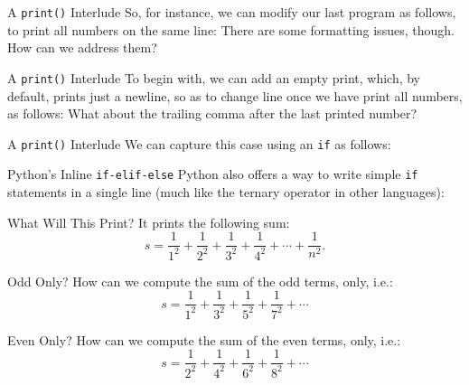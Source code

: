 \documentclass[aspectratio=169, 12pt, xcolor=table]{beamer}
\begin{document}
	\begin{frame}{A \texttt{print()} Interlude}
		So, for instance, we can modify our last program as follows, to print all numbers on the same line:
		\pause
		There are some formatting issues, though. How can we address them?
	\end{frame}

	\begin{frame}{A \texttt{print()} Interlude}
		To begin with, we can add an empty print, which, by default, prints just a newline, so as to change line once we have print all numbers, as follows:
		\pause
		What about the trailing comma after the last printed number?
	\end{frame}

	\begin{frame}{A \texttt{print()} Interlude}
		We can capture this case using an \texttt{if} as follows:
		
	\end{frame}

	\begin{frame}{Python's Inline \texttt{if-elif-else}}
		Python also offers a way to write simple \texttt{if} statements in a single line (much like the ternary operator in other languages):
		
	\end{frame}

	\begin{frame}{What Will This Print?}
		\pause
		It prints the following sum:
		\[s=\frac{1}{1^2}+\frac{1}{2^2}+\frac{1}{3^2}+\frac{1}{4^2}+\cdots+\frac{1}{n^2}.\]
	\end{frame}

	\begin{frame}{Odd Only?}
		How can we compute the sum of the odd terms, only, i.e.:
		\[s=\frac{1}{1^2}+\frac{1}{3^2}+\frac{1}{5^2}+\frac{1}{7^2}+\cdots\]\pause
		
	\end{frame}
	
	\begin{frame}{Even Only?}
		How can we compute the sum of the even terms, only, i.e.:
		\[s=\frac{1}{2^2}+\frac{1}{4^2}+\frac{1}{6^2}+\frac{1}{8^2}+\cdots\]\pause
		
	\end{frame}
\end{document}
